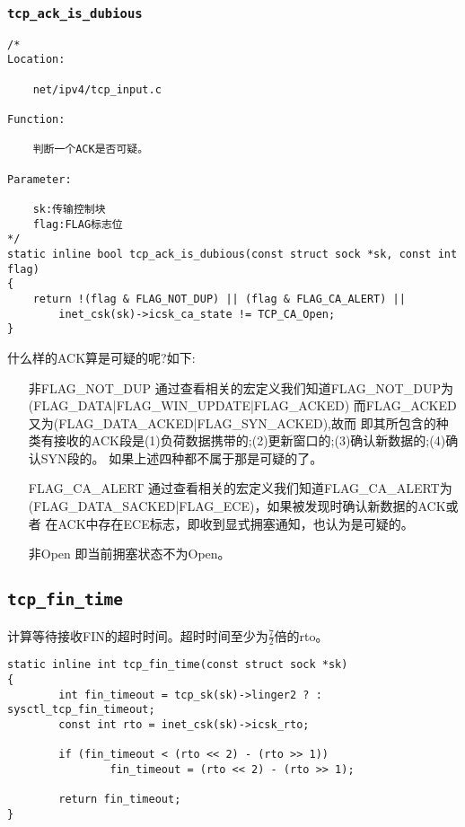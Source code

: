 		\subsubsection{\texttt{tcp_ack_is_dubious}}
\begin{verbatim}
/*
Location:

	net/ipv4/tcp_input.c

Function:

	判断一个ACK是否可疑。

Parameter:

	sk:传输控制块
	flag:FLAG标志位
*/
static inline bool tcp_ack_is_dubious(const struct sock *sk, const int flag)
{
	return !(flag & FLAG_NOT_DUP) || (flag & FLAG_CA_ALERT) ||
		inet_csk(sk)->icsk_ca_state != TCP_CA_Open;
}
\end{verbatim}

	什么样的ACK算是可疑的呢?如下:
\begin{enumerate}
\item[非FLAG\_NOT\_DUP]	通过查看相关的宏定义我们知道FLAG\_NOT\_DUP为(FLAG\_DATA|FLAG\_WIN\_UPDATE|FLAG\_ACKED)
						而FLAG\_ACKED又为(FLAG\_DATA\_ACKED|FLAG\_SYN\_ACKED),故而
						即其所包含的种类有接收的ACK段是(1)负荷数据携带的;(2)更新窗口的;(3)确认新数据的;(4)确认SYN段的。
						如果上述四种都不属于那是可疑的了。
			
\item[FLAG\_CA\_ALERT]	通过查看相关的宏定义我们知道FLAG\_CA\_ALERT为(FLAG\_DATA\_SACKED|FLAG\_ECE)，如果被发现时确认新数据的ACK或者
						在ACK中存在ECE标志，即收到显式拥塞通知，也认为是可疑的。\color{red}{似乎和上面的有矛盾，}
\item[非Open]			即当前拥塞状态不为Open。
\end{enumerate}
	

\subsection{\texttt{tcp_fin_time}}
计算等待接收FIN的超时时间。超时时间至少为$\frac{7}{2}$倍的rto。
\begin{verbatim}
static inline int tcp_fin_time(const struct sock *sk)
{
        int fin_timeout = tcp_sk(sk)->linger2 ? : sysctl_tcp_fin_timeout;
        const int rto = inet_csk(sk)->icsk_rto;

        if (fin_timeout < (rto << 2) - (rto >> 1))
                fin_timeout = (rto << 2) - (rto >> 1);

        return fin_timeout;
}
\end{verbatim}

